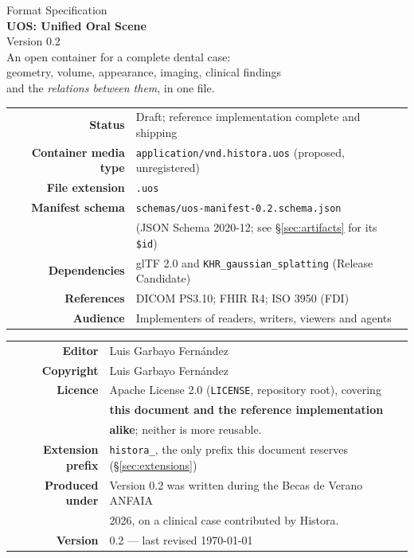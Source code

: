 \documentclass[11pt,a4paper]{article}
\newcommand{\code}[1]{\texttt{\small #1}}
\begin{document}
\begin{titlepage}
\centering
\vspace*{2.5cm}
{\color{uosgrey}\large Format Specification}\\[0.6cm]
{\color{uosblack}\Huge\bfseries UOS: Unified Oral Scene}\\[0.5cm]
{\color{uosblack}\LARGE Version 0.2}\\[1.4cm]
{\large An open container for a complete dental case:\\
geometry, volume, appearance, imaging, clinical findings\\
and the \emph{relations between them}, in one file.}\\[2.2cm]

\begin{tabular}{@{}rl@{}}
\textbf{Status} & Draft; reference implementation complete and shipping\\
\textbf{Container media type} & \code{application/vnd.histora.uos} (proposed, unregistered)\\
\textbf{File extension} & \code{.uos}\\
\textbf{Manifest schema} & \code{schemas/uos-manifest-0.2.schema.json}\\
 & (JSON Schema 2020-12; see \S\ref{sec:artifacts} for its \code{\$id})\\
\textbf{Dependencies} & glTF 2.0 and \code{KHR\_gaussian\_splatting} (Release Candidate)\\
\textbf{References} & DICOM PS3.10; FHIR R4; ISO 3950 (FDI)\\
\textbf{Audience} & Implementers of readers, writers, viewers and agents\\
\end{tabular}

\vspace{1.0cm}

\begin{tabular}{@{}rl@{}}
\textbf{Editor} & Luis Garbayo Fern\'andez\\
\textbf{Copyright} & Luis Garbayo Fern\'andez\\
\textbf{Licence} & Apache License 2.0 (\code{LICENSE}, repository root), covering\\
 & \textbf{this document and the reference implementation}\\
 & \textbf{alike}; neither is more reusable.\\
\textbf{Extension prefix} & \code{histora\_}, the only prefix this document reserves (\S\ref{sec:extensions})\\
\textbf{Produced under} & Version 0.2 was written during the Becas de Verano ANFAIA\\
 & 2026, on a clinical case contributed by Histora.\\
\textbf{Version} & 0.2 --- last revised \today\\
\end{tabular}


\end{titlepage}
\end{document}
